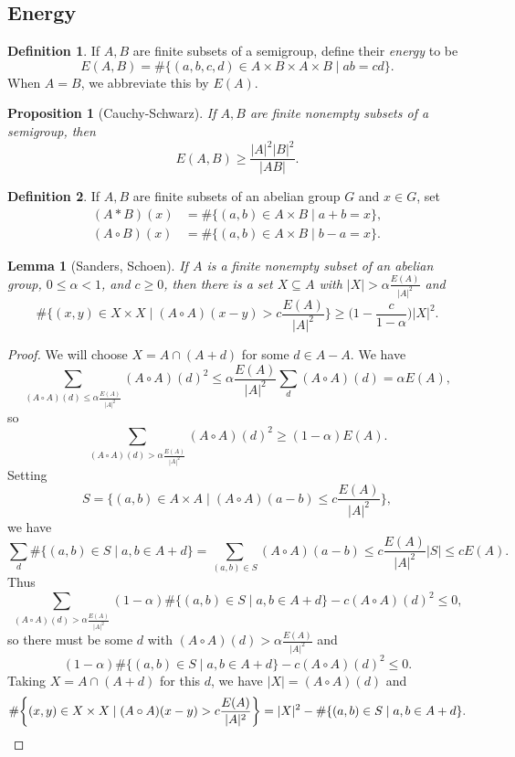 \documentclass[letterpaper,11pt]{article}
\newtheorem{lem}{Lemma}
\newtheorem{prop}{Proposition}
\theoremstyle{definition}
\newtheorem{defn}{Definition}
\theoremstyle{remark}
\begin{document}
\subsection{Energy}

\begin{defn} If $A,B$ are finite subsets of a semigroup, define their \emph{energy} to be
\[
E(A,B) = \#\{(a,b,c,d)\in A\times B \times A\times B \mid ab = cd\}.
\]
When $A=B$, we abbreviate this by $E(A)$.
\end{defn}

\begin{prop}[Cauchy-Schwarz] If $A,B$ are finite nonempty subsets of a semigroup, then
\[
E(A,B) \ge \frac{|A|^2|B|^2}{|AB|}.
\]
\end{prop}

\begin{defn} If $A,B$ are finite subsets of an abelian group $G$ and $x\in G$, set
\begin{align*}
(A*B)(x) &= \#\{(a,b)\in A\times B \mid a+b = x\},\\
(A\circ B)(x) &= \#\{(a,b)\in A\times B \mid b-a = x\}.
\end{align*}
\end{defn}

\begin{lem}[Sanders, Schoen]\label{sanders} If $A$ is a finite nonempty subset of an abelian group, $0 \le \alpha < 1$, and $c \ge 0$, then there is a set $X\subseteq A$ with $|X| > \alpha\frac{E(A)}{|A|^2}$ and
\[
\#\bigg\{(x,y)\in X\times X \mid (A\circ A)(x-y) > c\frac{E(A)}{|A|^2}\bigg\} \ge \bigg(1-\frac{c}{1-\alpha}\bigg)|X|^2.
\]
\end{lem}
\begin{proof} We will choose $X = A\cap (A+d)$ for some $d\in A-A$. We have
\[
\sum_{(A\circ A)(d) \le \alpha\frac{E(A)}{|A|^2}} (A\circ A)(d)^2 \le \alpha\frac{E(A)}{|A|^2}\sum_d (A\circ A)(d) = \alpha E(A),
\]
so
\[
\sum_{(A\circ A)(d) > \alpha\frac{E(A)}{|A|^2}} (A\circ A)(d)^2 \ge (1-\alpha)E(A).
\]
Setting
\[
S = \bigg\{(a,b)\in A\times A \mid (A\circ A)(a-b) \le c\frac{E(A)}{|A|^2}\bigg\},
\]
we have
\[
\sum_d \#\{(a,b) \in S \mid a,b \in A+d\} = \sum_{(a,b)\in S} (A\circ A)(a-b) \le c\frac{E(A)}{|A|^2}|S| \le cE(A).
\]
Thus
\[
\sum_{(A\circ A)(d) > \alpha\frac{E(A)}{|A|^2}} (1-\alpha)\#\{(a,b) \in S \mid a,b \in A+d\} - c(A\circ A)(d)^2 \le 0,
\]
so there must be some $d$ with $(A\circ A)(d) > \alpha\frac{E(A)}{|A|^2}$ and
\[
(1-\alpha)\#\{(a,b) \in S \mid a,b \in A+d\} - c(A\circ A)(d)^2 \le 0.
\]
Taking $X = A\cap (A+d)$ for this $d$, we have $|X| = (A\circ A)(d)$ and
\[
\#\bigg\{(x,y)\in X\times X \mid (A\circ A)(x-y) > c\frac{E(A)}{|A|^2}\bigg\} = |X|^2 - \#\{(a,b) \in S \mid a,b \in A+d\}.\qedhere
\]
\end{proof}
\end{document}
